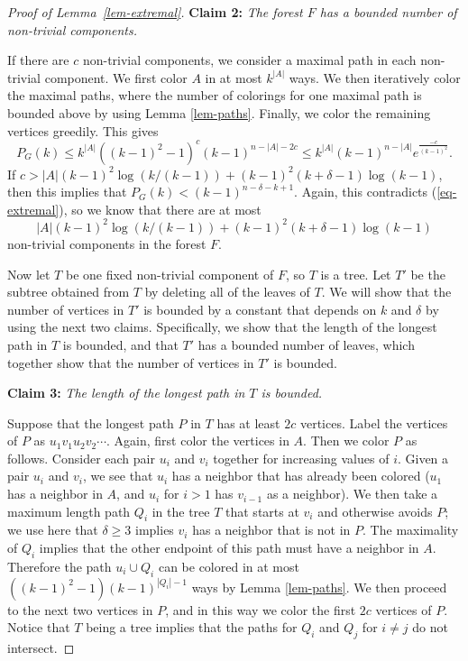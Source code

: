 \documentclass[11pt]{article}
\theoremstyle{plain}
\theoremstyle{definition}
\theoremstyle{remark}
\begin{document}
\begin{proof}[Proof of Lemma~\ref{lem-extremal}]
\bigskip

\noindent \textbf{Claim 2:} {\em The forest $F$ has a bounded number of non-trivial components.}

If there are $c$ non-trivial components, we consider a maximal path in each non-trivial component.  We first color $A$ in at most $k^{|A|}$ ways.  We then iteratively color the maximal paths, where the number of colorings for one maximal path is bounded above by using Lemma \ref{lem-paths}.  Finally, we color the remaining vertices greedily.  This gives
\[
P_{G}(k) \leq k^{|A|}((k-1)^2-1)^c(k-1)^{n-|A|-2c} \leq k^{|A|}(k-1)^{n-|A|}e^{\frac{-c}{(k-1)^2}}.
\]
If $c>|A|(k-1)^2\log(k/(k-1))+(k-1)^2(k+\delta-1)\log(k-1)$, then this implies that $P_G(k) < (k-1)^{n-\delta-k+1}$. Again, this contradicts (\ref{eq-extremal}), so we know that there are at most \[
|A|(k-1)^2\log(k/(k-1))+(k-1)^2(k+\delta-1)\log(k-1)
\]
non-trivial components in the forest $F$.

\bigskip


Now let $T$ be one fixed non-trivial component of $F$, so $T$ is a tree.  Let $T'$ be the subtree obtained from $T$ by deleting all of the leaves of $T$.  We will show that the number of vertices in $T'$ is bounded by a constant that depends on $k$ and $\delta$ by using the next two claims. Specifically, we show that the length of the longest path in $T$ is bounded, and that $T'$ has a bounded number of leaves, which together show that the number of vertices in $T'$ is bounded.

\bigskip

\noindent \textbf{Claim 3:} {\em The length of the longest path in $T$ is bounded.}

Suppose that the longest path $P$ in $T$ has at least $2c$ vertices.  Label the vertices of $P$ as $u_1 v_1 u_2 v_2 \cdots$. Again, first color the vertices in $A$.  Then we color $P$ as follows. Consider each pair $u_i$ and $v_i$ together for increasing values of $i$.  Given a pair $u_i$ and $v_i$, we see that $u_i$ has a neighbor that has already been colored ($u_1$ has a neighbor in $A$, and $u_i$ for $i>1$ has $v_{i-1}$ as a neighbor).  We then take a maximum length path $Q_i$ in the tree $T$ that starts at $v_i$ and otherwise avoids $P$; we use here that $\delta \geq 3$ implies $v_i$ has a neighbor that is not in $P$. The maximality of $Q_i$ implies that the other endpoint of this path must have a neighbor in $A$. Therefore the path $u_i \cup Q_i$ can be colored in at most $((k-1)^2-1)(k-1)^{|Q_i|-1}$ ways by Lemma \ref{lem-paths}. We then proceed to the next two vertices in $P$, and in this way we color the first $2c$ vertices of $P$. Notice that $T$ being a tree implies that the paths for $Q_i$ and $Q_j$ for $i \neq j$ do not intersect.


\end{proof}
\end{document}
